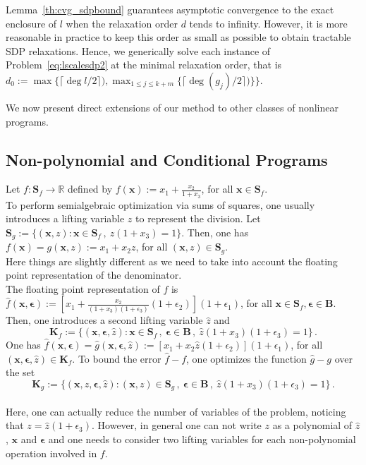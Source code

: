 \documentclass[preprint]{sigplanconf}
\newcommand{\R}{\mathbb{R}}
\newcommand{\x}{\mathbf{x}}
\newcommand{\epsilonb}{\boldsymbol{\epsilon}}
\def\S{\mathbf{S}}
\def\B{\mathbf{B}}
\def\K{\mathbf{K}}
\def\S{\mathbf{S}}
\theoremstyle{plain}
\begin{document}
%
Lemma~\ref{th:cvg_sdpbound} guarantees asymptotic convergence to the exact enclosure of $l$ when the relaxation order $d$ tends to infinity. However, it is more reasonable in practice to keep this order as small as possible to obtain tractable SDP relaxations. Hence, we generically solve each instance of Problem~\eqref{eq:lscalesdp2} at the minimal relaxation order, that is $d_0 := \max \{\lceil \deg l / 2\rceil) , \max_{1 \leq j \leq k+m} \{ \lceil \deg (g_j) / 2\rceil) \} \}$. 

We now present direct extensions of our method to other classes of nonlinear programs.
%
\subsection{Non-polynomial and Conditional Programs}

Let $f : \S_f \to \R$ defined by $f(\x) := x_1 + \frac{x_2}{1 + x_3}$, for all $\x \in \S_f$. \\
To perform semialgebraic optimization via sums of squares, one usually introduces a lifting variable  $z$ to represent the division. Let $\S_g := \{(\x,z) : \x \in \S_f\,, \ z (1 + x_3) = 1  \}$.
Then, one has $f(\x) = g(\x,z) := x_1 + x_2 z$, for all $(\x,z) \in \S_g$. \\
Here things are slightly different as we need to take into account the floating point representation of the denominator.\\
The floating point representation of $f$ is $\hat{f}(\x,\epsilonb) := [x_1 + \frac{x_2}{(1 + x_3)(1 + \epsilon_3)}(1 + \epsilon_2)](1 + \epsilon_1)$, for all $\x \in \S_f, \epsilonb \in \B$.
Then, one introduces a second lifting variable $\hat{z}$ and 
\[\K_f := \{(\x, \epsilonb, \hat{z}) : \x \in \S_f \,, \ \epsilonb \in \B \,, \ \hat{z} (1 + x_3) (1 + \epsilon_3) = 1  \} \,. \]
One has $\hat{f}(\x,\epsilonb) = \hat{g}(\x,\epsilonb,\hat{z}) := [x_1 + x_2 \hat{z}(1+\epsilon_2) ](1+\epsilon_1)$, for all $(\x, \epsilonb, \hat{z}) \in \K_f$. 
To bound the error $\hat{f} -f$, one optimizes the function $\hat{g} - g$ over the set 
\[\K_g := \{(\x, z, \epsilonb, \hat{z}) : (\x,z) \in \S_g \,, \ \epsilonb \in \B \,, \ \hat{z} (1 + x_3) (1 + \epsilon_3) = 1  \} \,. \]
\\
Here, one can actually reduce the number of variables of the problem, noticing that $z = \hat{z} (1 + \epsilon_3)$. However, in general one can not write $z$ as a polynomial of $\hat{z}$, $\x$ and $\epsilonb$ and one needs to consider two lifting variables for each non-polynomial operation involved in $f$.
%
\end{document}
